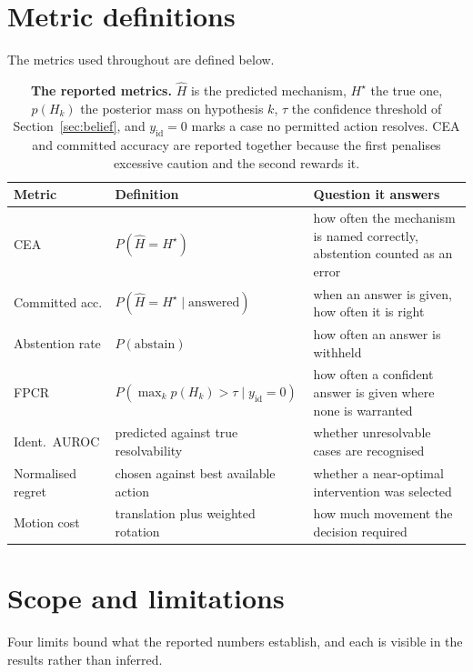 \section{Metric definitions}
\label{sec:supp-metrics}

The metrics used throughout are defined below.

\begin{table}[!ht]
\caption{\textbf{The reported metrics.} $\hat{H}$ is the predicted mechanism,
$H^\star$ the true one, $p(H_k)$ the posterior mass on hypothesis $k$, $\tau$ the
confidence threshold of Section~\ref{sec:belief}, and $y_{\mathrm{id}} = 0$ marks a
case no permitted action resolves. CEA and committed accuracy are reported together
because the first penalises excessive caution and the second rewards it.}
\label{tab:supp-metrics}
\begin{center}
\footnotesize
\begin{tabular}{llp{6.0cm}}
\toprule
\textbf{Metric} & \textbf{Definition} & \textbf{Question it answers} \\
\midrule
CEA & $P(\hat{H} = H^\star)$ & how often the mechanism is named correctly, abstention counted as an error \\
Committed acc. & $P(\hat{H} = H^\star \mid \text{answered})$ & when an answer is given, how often it is right \\
Abstention rate & $P(\text{abstain})$ & how often an answer is withheld \\
FPCR & $P(\max_k p(H_k) > \tau \mid y_{\mathrm{id}} = 0)$ & how often a confident answer is given where none is warranted \\
Ident.\ AUROC & predicted against true resolvability & whether unresolvable cases are recognised \\
Normalised regret & chosen against best available action & whether a near-optimal intervention was selected \\
Motion cost & translation plus weighted rotation & how much movement the decision required \\
\bottomrule
\end{tabular}
\end{center}
\end{table}

\section{Scope and limitations}
\label{sec:supp-limits}

Four limits bound what the reported numbers establish, and each is visible in the
results rather than inferred.

